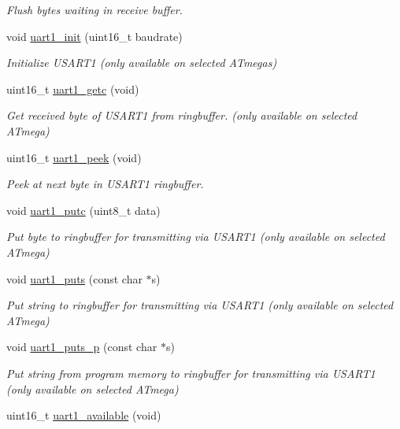 \begin{DoxyCompactItemize}
\begin{DoxyCompactList}\small\item\em Flush bytes waiting in receive buffer. \end{DoxyCompactList}\item 
void \hyperlink{group__avr-uart_ga31993c01ca0007ecddd47f19e239afe5}{uart1\-\_\-init} (uint16\-\_\-t baudrate)
\begin{DoxyCompactList}\small\item\em Initialize U\-S\-A\-R\-T1 (only available on selected A\-Tmegas) \end{DoxyCompactList}\item 
uint16\-\_\-t \hyperlink{group__avr-uart_ga07e1276e06323b0193b9e011012d9413}{uart1\-\_\-getc} (void)
\begin{DoxyCompactList}\small\item\em Get received byte of U\-S\-A\-R\-T1 from ringbuffer. (only available on selected A\-Tmega) \end{DoxyCompactList}\item 
\hypertarget{group__avr-uart_ga8b9dbcaa3571f021473f0cae243ad3b2}{uint16\-\_\-t \hyperlink{group__avr-uart_ga8b9dbcaa3571f021473f0cae243ad3b2}{uart1\-\_\-peek} (void)}\label{group__avr-uart_ga8b9dbcaa3571f021473f0cae243ad3b2}

\begin{DoxyCompactList}\small\item\em Peek at next byte in U\-S\-A\-R\-T1 ringbuffer. \end{DoxyCompactList}\item 
void \hyperlink{group__avr-uart_ga62da878e3872406cf82fda510487b83f}{uart1\-\_\-putc} (uint8\-\_\-t data)
\begin{DoxyCompactList}\small\item\em Put byte to ringbuffer for transmitting via U\-S\-A\-R\-T1 (only available on selected A\-Tmega) \end{DoxyCompactList}\item 
void \hyperlink{group__avr-uart_ga5568f8f3913b218fd4d0346af78831b2}{uart1\-\_\-puts} (const char $\ast$s)
\begin{DoxyCompactList}\small\item\em Put string to ringbuffer for transmitting via U\-S\-A\-R\-T1 (only available on selected A\-Tmega) \end{DoxyCompactList}\item 
void \hyperlink{group__avr-uart_ga1e8074d0a2d5922601c5db2f9777ba79}{uart1\-\_\-puts\-\_\-p} (const char $\ast$s)
\begin{DoxyCompactList}\small\item\em Put string from program memory to ringbuffer for transmitting via U\-S\-A\-R\-T1 (only available on selected A\-Tmega) \end{DoxyCompactList}\item 
\hypertarget{group__avr-uart_ga7529b13068cd91acfb2fdd0205dc5188}{uint16\-\_\-t \hyperlink{group__avr-uart_ga7529b13068cd91acfb2fdd0205dc5188}{uart1\-\_\-available} (void)}\label{group__avr-uart_ga7529b13068cd91acfb2fdd0205dc5188}


\end{DoxyCompactItemize}
